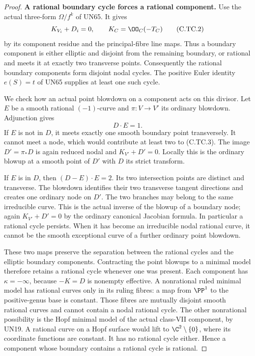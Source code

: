\begin{proof}
\par\medskip\noindent\textbf{A rational boundary cycle forces a rational component.}
Use the actual three-form $\Omega/f^k$ of UN65.
It gives
\[
               K_{V_i}+D_i=0,\qquad
               K_C=\OO_C(-T_C)
\tag{C.TC.2}
\]
by its component residue and the principal-fibre line maps.
Thus a boundary component is either elliptic and disjoint
from the remaining boundary, or rational and meets it
at exactly two transverse points. Consequently the
rational boundary components form disjoint nodal cycles.
The positive Euler identity $e(S)=t$ of UN65 supplies
at least one such cycle.

We check how an actual point blowdown on a component
acts on this divisor. Let $E$ be a smooth rational
$(-1)$-curve and $\pi:V\to V'$ its ordinary blowdown.
Adjunction gives
\[
                         D\cdot E=1.
\tag{C.TC.3}
\]
If $E$ is not in $D$, it meets exactly one smooth
boundary point transversely. It cannot meet a node,
which would contribute at least two to (C.TC.3).
The image $D'=\pi_*D$ is again reduced nodal and
$K_{V'}+D'=0$. Locally this is the ordinary blowup
at a smooth point of $D'$ with $D$ its strict transform.

If $E$ is in $D$, then
$(D-E)\cdot E=2$. Its two intersection points are
distinct and transverse. The blowdown identifies
their two transverse tangent directions and creates
one ordinary node on $D'$. The two branches may
belong to the same irreducible curve. This is the
actual inverse of the blowup of a boundary node;
again $K_{V'}+D'=0$ by the ordinary canonical
Jacobian formula. In particular a rational cycle
persists. When it has become an irreducible nodal
rational curve, it cannot be the smooth exceptional
curve of a further ordinary point blowdown.

These two maps preserve the separation between
the rational cycles and the elliptic boundary
components. Contracting the point blowups to
a minimal model therefore retains a rational
cycle whenever one was present. Each component
has $\kappa=-\infty$, because $-K=D$ is
nonempty effective. A nonrational ruled minimal
model has rational curves only in its ruling
fibres: a map from $\PP^1$ to the positive-genus
base is constant. Those fibres are mutually
disjoint smooth rational curves and cannot
contain a nodal rational cycle. The other
nonrational possibility is the Hopf minimal
model of the actual class-VII component,
by UN19. A rational curve on a Hopf surface
would lift to $\C^2\setminus\{0\}$, where
its coordinate functions are constant. It
has no rational cycle either. Hence a
component whose boundary contains a rational
cycle is rational.


\end{proof}
